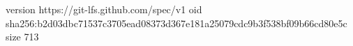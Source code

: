 version https://git-lfs.github.com/spec/v1
oid sha256:b2d03dbc71537c3705ead08373d367e181a25079cdc9b3f538bf09b66cd80e5c
size 713
